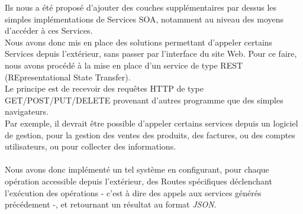 Ils nous a été proposé d'ajouter des couches supplémentaires par dessus les simples implémentations de Services SOA, notamment au niveau des moyens d'accéder à ces Services.\\
Nous avons donc mis en place des solutions permettant d'appeler certains Services depuis l'extérieur, sans passer par l'interface du site Web. Pour ce faire, nous avons procédé à la mise en place d'un service de type REST (REpresentational State Transfer).\\
Le principe est de recevoir des requêtes HTTP de type GET/POST/PUT/DELETE provenant d'autres programme que des simples navigateurs. \\
Par exemple, il devrait être possible d'appeler certains services depuis un logiciel de gestion, pour la gestion des ventes des produits, des factures, ou des comptes utilisateurs, ou pour collecter des informations.
\\\\
Nous avons donc implémenté un tel système en configurant, pour chaque opération accessible depuis l'extérieur, des Routes spécifiques déclenchant l'exécution des opérations - c'est à dire des appels aux services générés précédement -, et retournant un résultat au format \textit{JSON}.


\clearpage
